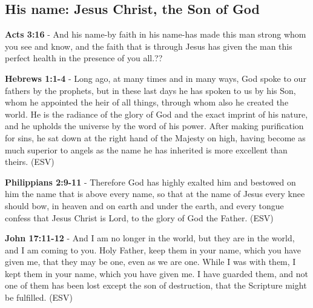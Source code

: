 \documentclass[11pt]{article}
\begin{document}
\subsection{His name: Jesus Christ, the Son of God}
\label{sec:org340c538}
\textbf{Acts 3:16} - And his name-by faith in his name-has made this man strong whom you see and know, and the faith that is through Jesus has given the man this perfect health in the presence of you all.??

\textbf{Hebrews 1:1-4} -  Long ago, at many times and in many ways, God spoke to our fathers by the prophets, but in these last days he has spoken to us by his Son, whom he appointed the heir of all things, through whom also he created the world.  He is the radiance of the glory of God and the exact imprint of his nature, and he upholds the universe by the word of his power.  After making purification for sins, he sat down at the right hand of the Majesty on high, having become as much superior to angels as the name he has inherited is more excellent than theirs. (ESV)

\textbf{Philippians 2:9-11} - Therefore God has highly exalted him and bestowed on him the name that is above every name, so that at the name of Jesus every knee should bow, in heaven and on earth and under the earth, and every tongue confess that Jesus Christ is Lord, to the glory of God the Father. (ESV)

\textbf{John 17:11-12} -  And I am no longer in the world, but they are in the world, and I am coming to you.  Holy Father, keep them in your name, which you have given me, that they may be one, even as we are one.  While I was with them, I kept them in your name, which you have given me.  I have guarded them, and not one of them has been lost except the son of destruction, that the Scripture might be fulfilled. (ESV)
\end{document}
